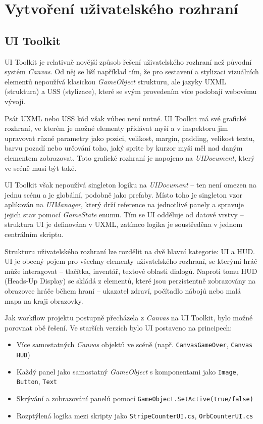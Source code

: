 \section{Vytvoření uživatelského rozhraní}
\label{sec:vytvoreni-uzivatelskeho-rozhrani}

\subsection{UI Toolkit}
\label{sec:ui-toolkit}

UI Toolkit je relativně novější způsob řešení uživatelského rozhraní než původní systém \emph{Canvas}. Od něj se liší například tím, že pro sestavení a stylizaci vizuálních elementů nepoužívá klasickou \emph{GameObject} strukturu, ale jazyky UXML (struktura) a USS (stylizace), které se svým provedením více podobají webovému vývoji.

Psát UXML nebo USS kód však vůbec není nutné. UI Toolkit má své grafické rozhraní, ve kterém je možné elementy přidávat myší a v inspektoru jim upravovat různé parametry jako pozici, velikost, margin, padding, velikost textu, barvu pozadí nebo určování toho, jaký sprite by kurzor myši měl nad daným elementem zobrazovat. Toto grafické rozhraní je napojeno na \emph{UIDocument}, který ve scéně musí být také.

UI Toolkit však nepoužívá singleton logiku na \emph{UIDocument} -- ten není omezen na jednu scénu a je globální, podobně jako prefaby. Místo toho je singleton vzor aplikován na \emph{UIManager}, který drží reference na jednotlivé panely a spravuje jejich stav pomocí \emph{GameState} enumu. Tím se UI odděluje od datové vrstvy -- struktura UI je definována v UXML, zatímco logika je soustředěna v jednom centrálním skriptu.

Strukturu uživatelského rozhraní lze rozdělit na dvě hlavní kategorie: UI a HUD. UI je obecný pojem pro všechny elementy uživatelského rozhraní, se kterými hráč může interagovat -- tlačítka, inventář, textové oblasti dialogů. Naproti tomu HUD (Heads-Up Display) se skládá z elementů, které jsou perzistentně zobrazovány na obrazovce hráče během hraní -- ukazatel zdraví, počítadlo nábojů nebo malá mapa na kraji obrazovky.

Jak workflow projektu postupně přecházela z \emph{Canvas} na UI Toolkit, bylo možné porovnat obě řešení. Ve starších verzích bylo UI postaveno na principech:

\begin{itemize}
    \item Více samostatných \emph{Canvas} objektů ve scéně (např. \texttt{CanvasGameOver}, \texttt{Canvas HUD})
    \item Každý panel jako samostatný \emph{GameObject} s komponentami jako \texttt{Image}, \texttt{Button}, \texttt{Text}
    \item Skrývání a zobrazování panelů pomocí \texttt{GameObject.SetActive(true/false)}
    \item Rozptýlená logika mezi skripty jako \texttt{StripeCounterUI.cs}, \texttt{OrbCounterUI.cs}
\end{itemize}

